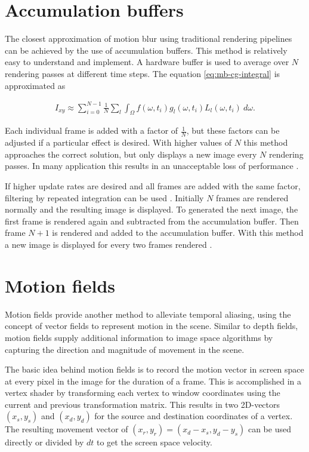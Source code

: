 \section{Accumulation buffers}
\label{ch:mb-acc}
The closest approximation of motion blur using traditional rendering pipelines can be achieved by the use of accumulation buffers.
This method is relatively easy to understand and implement.
A hardware buffer is used to average over $N$ rendering passes at different time steps.
The equation \ref{eq:mb-cg-integral} is approximated as

\begin{align}
    I_{xy} \approx \sum_{i=0}^{N-1} \frac{1}{N} \sum_{l} \int_\Omega f(\omega, t_i) g_l(\omega, t_i) L_l(\omega, t_i) \: d\omega.
\end{align}

Each individual frame is added with a factor of $\frac{1}{N}$, but these factors can be adjusted if a particular effect is desired.
With higher values of $N$ this method approaches the correct solution, but only displays a new image every $N$ rendering passes.
In many application this results in an unacceptable loss of performance \cite{Haeberli.1990}.

If higher update rates are desired and all frames are added with the same factor, filtering by repeated integration can be used \cite{Heckbert.1986}.
Initially $N$ frames are rendered normally and the resulting image is displayed.
To generated the next image, the first frame is rendered again and subtracted from the accumulation buffer.
Then frame $N+1$ is rendered and added to the accumulation buffer.
With this method a new image is displayed for every two frames rendered \cite{Haeberli.1990}.

\section{Motion fields}
\label{ch:mb-mf}
Motion fields provide another method to alleviate temporal aliasing, using the concept of vector fields to represent motion in the scene.
Similar to depth fields, motion fields supply additional information to image space algorithms by capturing the direction and magnitude of movement in the scene.

The basic idea behind motion fields is to record the motion vector in screen space at every pixel in the image for the duration of a frame.
This is accomplished in a vertex shader by transforming each vertex to window coordinates using the current and previous transformation matrix.
This results in two 2D-vectors $(x_s,y_s)$ and $(x_d,y_d)$ for the source and destination coordinates of a vertex.
The resulting movement vector of $(x_r,y_r) = (x_d - x_s,y_d - y_s)$ can be used directly or divided by $dt$ to get the screen space velocity.

